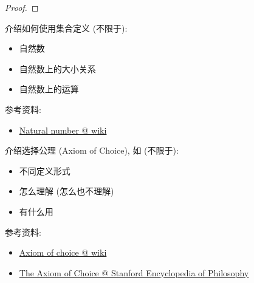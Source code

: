 \documentclass[a4paper, justified]{tufte-handout}
\begin{document}
\begin{proof}
\end{proof}

\beginoptional

\begin{problem}[UD Problem 9.23]
\end{problem}

\begin{solution}
\end{solution}

\beginot

\begin{ot}[自然数]
  介绍如何使用集合定义 (不限于):
  \begin{itemize}
    \item 自然数
    \item 自然数上的大小关系
    \item 自然数上的运算
  \end{itemize}

  \noindent 参考资料:
  \begin{itemize}
    \item \href{https://en.wikipedia.org/wiki/Natural\_number}{Natural number @ wiki}
  \end{itemize}
\end{ot}

\vspace{0.50cm}
\begin{ot}[选择公理]
  介绍选择公理 (Axiom of Choice), 如 (不限于):
  \begin{itemize}
    \item 不同定义形式
    \item 怎么理解 (怎么也不理解)
    \item 有什么用
  \end{itemize}

  \noindent 参考资料:
  \begin{itemize}
    \item \href{https://en.wikipedia.org/wiki/Axiom\_of\_choice}{Axiom of choice @ wiki}
    \item \href{https://plato.stanford.edu/entries/axiom-choice/}{The Axiom of Choice @ Stanford Encyclopedia of Philosophy}
  \end{itemize}
\end{ot}
\end{document}
